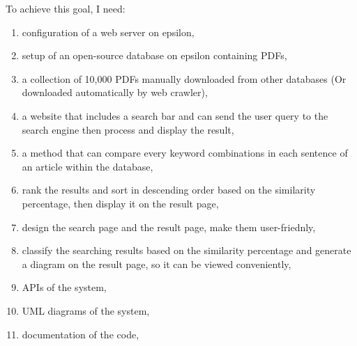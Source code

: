 
  To achieve this goal, I need:
\begin{enumerate}
  \item configuration of a web server on epsilon,
  \item setup of an open-source database on epsilon containing PDFs,
  \item a collection of 10,000 PDFs manually downloaded from other databases (Or downloaded automatically by web crawler),
  \item a website that includes a search bar and can send the user query to the search engine then process and display the result,
  \item a method that can compare every keyword combinations in each sentence of an article within the database,
  \item rank the results and sort in descending order based on the similarity percentage, then display it on the result page,
  \item design the search page and the result page, make them  user-friednly,
  \item classify the searching results based on the similarity percentage and generate a diagram on the result page, so it can be viewed conveniently,
  \item APIs of the system,
  \item UML diagrams of the system,
  \item documentation of the code, 
\end{enumerate}
